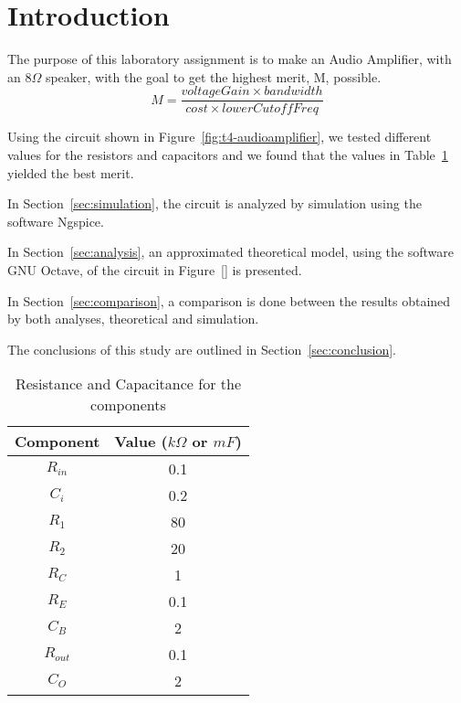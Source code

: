 \section{Introduction}
\label{sec:introduction}

The purpose of this laboratory assignment is to make an Audio Amplifier, with an $8\Omega$ speaker, with the goal to get the highest merit, M, possible.
$$ M = \frac{voltageGain \times bandwidth}{cost \times lowerCutoffFreq}$$

Using the circuit shown in Figure~\ref{fig:t4-audioamplifier}, we tested different values for the resistors and capacitors and we found that the values in Table~\ref{tab:values} yielded the best merit.

In Section~\ref{sec:simulation}, the circuit is analyzed by simulation using the software Ngspice. 

In Section~\ref{sec:analysis}, an approximated theoretical model, using the software GNU Octave, of the circuit in Figure~\ref{} is presented. 

In Section~\ref{sec:comparison}, a comparison is done between the results obtained by both analyses, theoretical and simulation.

The conclusions of this study are outlined in Section~\ref{sec:conclusion}.

\begin{table}[ht!]
    \centering
    \begin{tabular}{c c}
    \toprule
    Component & Value ($k\Omega$ or $mF$) \\ \midrule
    $R_{in}$  & 0.1 \\
    $C_i$     & 0.2 \\
    $R_1$     & 80  \\
    $R_2$     & 20  \\
    $R_C$     & 1   \\
    $R_E$     & 0.1 \\
    $C_B$     & 2   \\
    $R_{out}$ & 0.1 \\
    $C_O$     & 2   \\
    \end{tabular}
    \label{tab:values}
    \caption{Resistance and Capacitance for the components}
\end{table}

